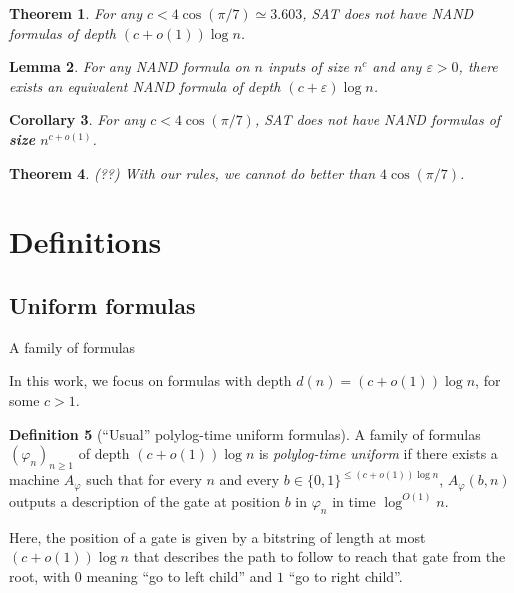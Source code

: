 \documentclass[a4paper, 11pt]{article}
\theoremstyle{plain}
\newtheorem{theorem}{Theorem}[section] %
\newtheorem{lemma}[theorem]{Lemma}
\newtheorem{corollary}[theorem]{Corollary}
\theoremstyle{definition}
\newtheorem{definition}[theorem]{Definition}
\theoremstyle{remark}
\newcommand{\eps}{\varepsilon}%
\newcommand{\bit}{\{0,1\}}%
\newcommand{\SAT}{\textsf{SAT}}%
\newcommand{\NAND}{\textsf{NAND}}%
\begin{document}
\begin{theorem}
	For any $c < 4 \cos(\pi/7) \simeq 3.603$, \SAT{} does not have \NAND{} formulas of depth $(c + o(1)) \log n$.
\end{theorem}

\begin{lemma}
	For any \NAND{} formula on $n$ inputs of size $n^c$ and any $\eps > 0$, 
	there exists an equivalent \NAND{} formula of depth $(c+\eps) \log n$.
\end{lemma}

\begin{corollary}
	For any $c < 4 \cos(\pi/7)$, \SAT{} does not have \NAND{} formulas of \textbf{size} $n^{c + o(1)}$.
\end{corollary}

\begin{theorem} (??)
	With our rules, we cannot do better than $4 \cos(\pi/7)$.
\end{theorem}

\section{Definitions}

\subsection{Uniform formulas}
A family of formulas

In this work, we focus on formulas with depth $d(n) = (c + o(1))\log n$, for some $c > 1$.

\begin{definition}[``Usual'' polylog-time uniform formulas]
	A family of formulas $(\varphi_n)_{n \ge 1}$ of depth $(c + o(1))\log n$ 
	is \textit{polylog-time uniform} if there exists a machine $A_\varphi$
	such that for every $n$ and every $b\in\bit^{\leq (c + o(1))\log n}$,
	$A_\varphi(b, n)$ outputs a description of the gate at position $b$ in $\varphi_n$ in time $\log^{O(1)} n$.
\end{definition}

Here, the position of a gate is given by a bitstring of length at most $(c + o(1))\log n$ 
that describes the path to follow to reach that gate from the root, 
with $0$ meaning ``go to left child'' and $1$ ``go to right child''.
\end{document}
